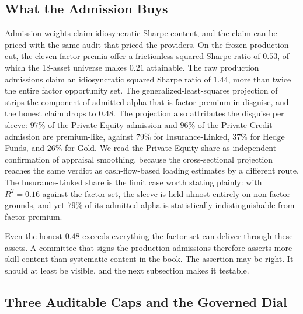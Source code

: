 \documentclass[pdftex,12pt,a4paper]{article}
\begin{document}
\subsection*{What the Admission Buys}\label{subsec:admission_sr2}

Admission weights claim idiosyncratic Sharpe content, and the claim can be priced with the same audit that priced the providers. On the frozen production cut, the eleven factor premia offer a frictionless squared Sharpe ratio of $0.53$, of which the 18-asset universe makes $0.21$ attainable. The raw production admissions claim an idiosyncratic squared Sharpe ratio of $1.44$, more than twice the entire factor opportunity set. The generalized-least-squares projection of \citet{SeppKastenholzFAJ2026} strips the component of admitted alpha that is factor premium in disguise, and the honest claim drops to $0.48$. The projection also attributes the disguise per sleeve: $97\%$ of the Private Equity admission and $96\%$ of the Private Credit admission are premium-like, against $79\%$ for Insurance-Linked, $37\%$ for Hedge Funds, and $26\%$ for Gold. We read the Private Equity share as independent confirmation of appraisal smoothing, because the cross-sectional projection reaches the same verdict as cash-flow-based loading estimates by a different route. The Insurance-Linked share is the limit case worth stating plainly: with $R^2 = 0.16$ against the factor set, the sleeve is held almost entirely on non-factor grounds, and yet $79\%$ of its admitted alpha is statistically indistinguishable from factor premium.

Even the honest $0.48$ exceeds everything the factor set can deliver through these assets. A committee that signs the production admissions therefore asserts more skill content than systematic content in the book. The assertion may be right. It should at least be visible, and the next subsection makes it testable.

\subsection*{Three Auditable Caps and the Governed Dial}\label{subsec:admission_caps}
\end{document}
